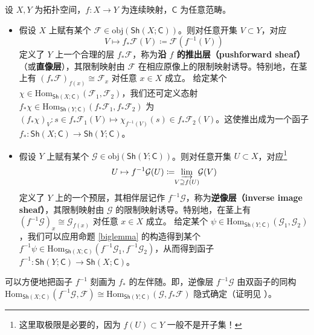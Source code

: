 \begin{Def}\label{pushforwardShAb}
设 $X,Y$ 为拓扑空间，$f:X\rightarrow Y$ 为连续映射，$\mathsf{C}$ 为任意范畴。
\begin{itemize}[leftmargin=0.5cm]
	\item 假设 $X$ 上赋有某个 $\mathcal{F}\in\text{obj}(\mathsf{Sh}(X;\mathsf{C}))$。则对任意开集 $V\subset Y$，对应
	\begin{equation}\label{pushforwardsheaf}
		V\mapsto f_*\mathcal{F}(V)\coloneqq\mathcal{F}(f^{-1}(V))
	\end{equation}
	定义了 $Y$ 上一个合理的层 $f_*\mathcal{F}$，称为\textbf{沿 $f$ 的推出层（pushforward sheaf）}（或\textbf{直像层}），其限制映射由 $\mathcal{F}$ 在相应原像上的限制映射诱导。特别地，在茎上有 $(f_*\mathcal{F})_{f(x)}\cong\mathcal{F}_x$ 对任意 $x\in X$ 成立。
	\newline 给定某个 $\chi\in\text{Hom}_{\mathsf{Sh}(X;\mathsf{C})}(\mathcal{F}_1,\mathcal{F}_2)$，我们还可定义态射 $f_*\chi\in\text{Hom}_{\mathsf{Sh}(Y;\mathsf{C})}(f_*\mathcal{F}_1,f_*\mathcal{F}_2)$ 为 $(f_*\chi)_V:s\in f_*\mathcal{F}_1(V)\mapsto\chi_{f^{-1}(V)}(s)\in f_*\mathcal{F}_2(V)$。这使推出成为一个函子 $f_*:\mathsf{Sh}(X;\mathsf{C})\rightarrow\mathsf{Sh}(Y;\mathsf{C})$。
	
	\item 假设 $Y$ 上赋有某个 $\mathcal{G}\in\text{obj}(\mathsf{Sh}(Y;\mathsf{C}))$。则对任意开集 $U\subset X$，对应\footnote{这里取极限是必要的，因为 $f(U)\subset Y$ 一般不是开子集！}
	\begin{equation}
		U\mapsto f^{-1}\mathcal{G}(U)\coloneqq\mkern-6mu\varinjlim_{V\supseteq f(U)}\mkern-6mu\mathcal{G}(V)
	\end{equation}
	定义了 $Y$ 上的一个预层，其相伴层记作 $f^{-1}\mathcal{G}$，称为\textbf{逆像层（inverse image sheaf）}，其限制映射由 $\mathcal{G}$ 的限制映射诱导。特别地，在茎上有 $(f^{-1}\mathcal{G})_x\cong\mathcal{G}_{f(x)}$ 对任意 $x\in X$ 成立。
	\newline 给定某个 $\psi\in\text{Hom}_{\mathsf{Sh}(Y;\mathsf{C})}(\mathcal{G}_1,\mathcal{G}_2)$，我们可以应用命题 \ref{biglemma} 的构造得到某个 $f^{-1}\psi\in\text{Hom}_{\mathsf{Sh}(X;\mathsf{C})}(f^{-1}\mathcal{G}_1,f^{-1}\mathcal{G}_2)$，从而得到函子 $f^{-1}:\mathsf{Sh}(Y;\mathsf{C})\rightarrow\mathsf{Sh}(X;\mathsf{C})$。
\end{itemize}
可以方便地把函子 $f^{-1}$ 刻画为 $f_*$ 的左伴随。即，逆像层 $f^{-1}\mathcal{G}$ 由双函子的同构 $\text{Hom}_{\mathsf{Sh}(X;\mathsf{C})}(f^{-1}\mathcal{G},\mathcal{F})\cong\text{Hom}_{\mathsf{Sh}(Y;\mathsf{C})}(\mathcal{G},f_*\mathcal{F})$ 隐式确定（证明见 \cite[Proposition II.6.17]{[GM03]}）。
\end{Def}

